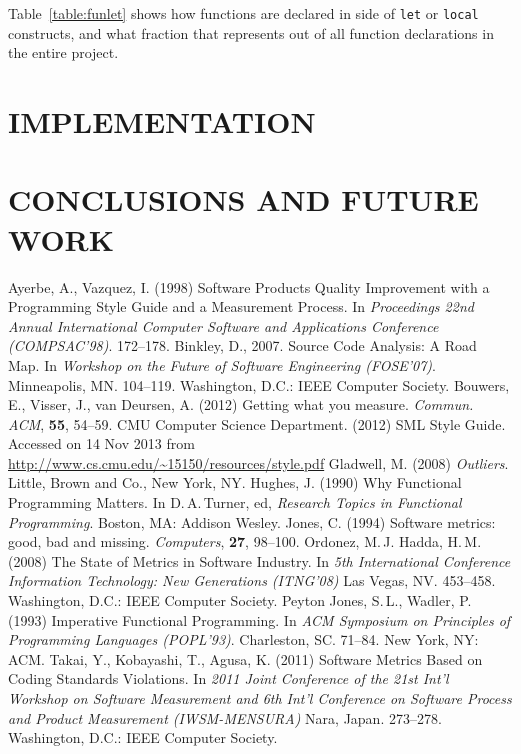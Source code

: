\documentclass[12pt,abstracton]{scrartcl}
\begin{document}
Table~\ref{table:funlet} shows how functions are declared in side of \texttt{let} or \texttt{local}
constructs, and what fraction that represents out of all function declarations in the
entire project.
\section{IMPLEMENTATION}\label{sec:impl}
\section{CONCLUSIONS AND FUTURE WORK}\label{sec:future}
\begin{thebibliography}{99}
 Ayerbe, A., Vazquez, I. (1998) Software Products Quality Improvement with a Programming Style Guide and a Measurement Process. In \emph{Proceedings 22nd Annual International Computer Software and Applications Conference (COMPSAC'98)}. 172--178.
 Binkley, D., 2007. Source Code Analysis: A Road Map. In \emph{Workshop on the Future of Software Engineering (FOSE'07)}. Minneapolis, MN. 104--119. Washington, D.C.: IEEE Computer Society.
 Bouwers, E., Visser, J., van Deursen, A. (2012) Getting what you measure. \emph{Commun. ACM}, \textbf{55}, 54--59.
 CMU Computer Science Department. (2012) SML Style Guide. Accessed on 14 Nov 2013 from \url{http://www.cs.cmu.edu/~15150/resources/style.pdf}
 Gladwell, M. (2008) \emph{Outliers}. Little, Brown and Co., New York, NY.
 Hughes, J. (1990) Why Functional Programming Matters. In D.\,A.\,Turner, ed, \emph{Research Topics in Functional Programming}. Boston, MA: Addison Wesley.
 Jones, C. (1994) Software metrics: good, bad and missing. \emph{Computers}, \textbf{27}, 98--100.
 Ordonez, M.\,J. Hadda, H.\,M. (2008) The State of Metrics in Software Industry. In \emph{5th International Conference Information Technology: New Generations (ITNG'08)} Las Vegas, NV. 453--458. Washington, D.C.: IEEE Computer Society.
 Peyton Jones, S.\,L., Wadler, P. (1993) Imperative Functional Programming. In \emph{ACM Symposium on Principles of Programming Languages (POPL'93)}. Charleston, SC. 71--84. New York, NY: ACM.
 Takai, Y., Kobayashi, T., Agusa, K. (2011) Software Metrics Based on Coding Standards Violations. In \emph{2011 Joint Conference of the 21st Int'l Workshop on Software Measurement and 6th Int'l Conference on Software Process and Product Measurement (IWSM-MENSURA)} Nara, Japan. 273--278. Washington, D.C.: IEEE Computer Society.

\end{thebibliography}
\end{document}
